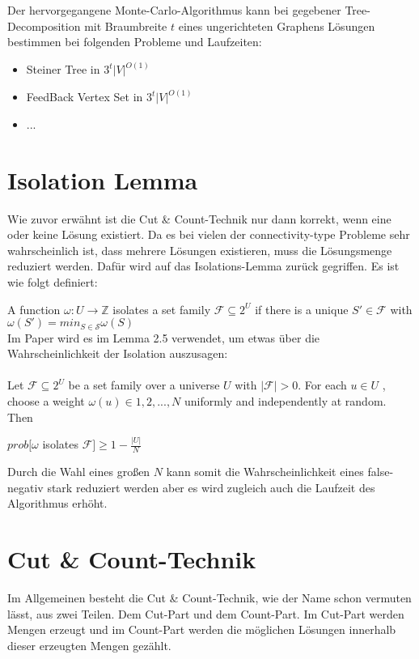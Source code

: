 Der hervorgegangene Monte-Carlo-Algorithmus kann bei gegebener Tree-Decomposition mit Braumbreite $t$ eines ungerichteten Graphens Lösungen bestimmen bei folgenden Probleme und Laufzeiten:
\begin{itemize}
\item Steiner Tree in $3^t |V|^{O(1)}$
\item FeedBack Vertex Set in $3^t|V|^{O(1)}$
\item ...
\end{itemize}

\section{Isolation Lemma}
\label{sec:test}

Wie zuvor erwähnt ist die Cut \& Count-Technik nur dann korrekt, wenn eine oder keine Lösung existiert. Da es bei vielen der connectivity-type Probleme sehr  wahrscheinlich ist, dass mehrere Lösungen existieren, muss die Lösungsmenge reduziert werden. Dafür wird auf das Isolations-Lemma zurück gegriffen. Es ist wie folgt definiert:

A function $\omega : U \rightarrow \mathbb{Z}$ isolates a set family $\mathcal{F} \subseteq 2^U$ if there is a unique $S' \in \mathcal{F}$ with $\omega (S')=min_{S \in \mathcal{S}} \omega(S)$\\

Im Paper wird es im Lemma 2.5 verwendet, um etwas über die Wahrscheinlichkeit der Isolation auszusagen:\\
\\Let $\mathcal{F} \subseteq 2^U$ be a set family over a universe $U$ with $|\mathcal{F}| > 0$. For each $u \in U$ ,
choose a weight $\omega(u) \in {1, 2, . . . , N }$ uniformly and independently at random. Then
\begin{center}
$prob[\omega$ isolates $\mathcal{F}]\geq 1 - \frac{|U|}{N}$
\end{center}

Durch die Wahl eines großen $N$ kann somit die Wahrscheinlichkeit eines false-negativ stark reduziert werden aber es wird zugleich auch die Laufzeit des Algorithmus erhöht. 

\section{Cut \& Count-Technik}
\label{sec:3}
Im Allgemeinen besteht die Cut \& Count-Technik, wie der Name schon vermuten lässt, aus zwei Teilen. Dem Cut-Part und dem Count-Part.
Im Cut-Part werden Mengen erzeugt und im Count-Part werden die möglichen Lösungen innerhalb dieser erzeugten Mengen gezählt.

